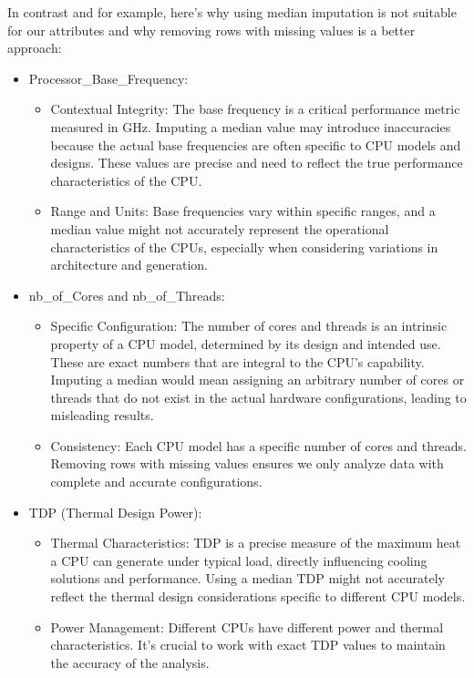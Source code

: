 In contrast and for example, here's why using median imputation is not suitable for our attributes and why removing rows with missing values is a better approach:
\begin{itemize}
    \item Processor\_Base\_Frequency:
    \begin{itemize}
        \item Contextual Integrity: The base frequency is a critical performance metric measured in GHz. Imputing a median value may introduce inaccuracies because the actual base frequencies are often specific to CPU models and designs. These values are precise and need to reflect the true performance characteristics of the CPU.
        \item Range and Units: Base frequencies vary within specific ranges, and a median value might not accurately represent the operational characteristics of the CPUs, especially when considering variations in architecture and generation.
    \end{itemize}

    \item nb\_of\_Cores and nb\_of\_Threads:
    \begin{itemize}
        \item Specific Configuration: The number of cores and threads is an intrinsic property of a CPU model, determined by its design and intended use. These are exact numbers that are integral to the CPU's capability. Imputing a median would mean assigning an arbitrary number of cores or threads that do not exist in the actual hardware configurations, leading to misleading results.
        \item Consistency: Each CPU model has a specific number of cores and threads. Removing rows with missing values ensures we only analyze data with complete and accurate configurations.
    \end{itemize}

    \item TDP (Thermal Design Power):
    \begin{itemize}
        \item Thermal Characteristics: TDP is a precise measure of the maximum heat a CPU can generate under typical load, directly influencing cooling solutions and performance. Using a median TDP might not accurately reflect the thermal design considerations specific to different CPU models.
        \item Power Management: Different CPUs have different power and thermal characteristics. It's crucial to work with exact TDP values to maintain the accuracy of the analysis.
    \end{itemize}


\end{itemize}
